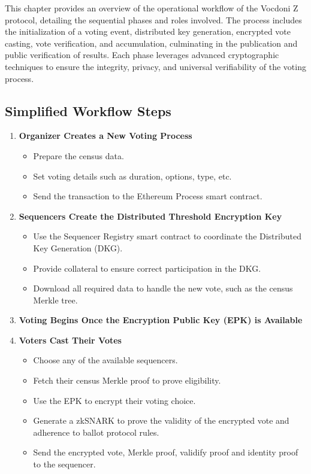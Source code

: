 
This chapter provides an overview of the operational workflow of the Vocdoni Z protocol, detailing the sequential phases and roles involved. The process includes the initialization of a voting event, distributed key generation, encrypted vote casting, vote verification, and accumulation, culminating in the publication and public verification of results. Each phase leverages advanced cryptographic techniques to ensure the integrity, privacy, and universal verifiability of the voting process.

\subsection{Simplified Workflow Steps}

\begin{enumerate}
	\item \textbf{Organizer Creates a New Voting Process}
	
		\begin{itemize}
			\item Prepare the census data.
			\item Set voting details such as duration, options, type, etc.
			\item Send the transaction to the Ethereum Process smart contract.
		\end{itemize}
	
	\item \textbf{Sequencers Create the Distributed Threshold Encryption Key}
	
			\begin{itemize}
				\item Use the Sequencer Registry smart contract to coordinate the Distributed Key Generation (DKG).
				\item Provide collateral to ensure correct participation in the DKG.
				\item Download all required data to handle the new vote, such as the census Merkle tree.
			\end{itemize}
	
	\item \textbf{Voting Begins Once the Encryption Public Key (EPK) is Available}
	
	\item \textbf{Voters Cast Their Votes}

			\begin{itemize}
				\item Choose any of the available sequencers.
				\item Fetch their census Merkle proof to prove eligibility.
				\item Use the EPK to encrypt their voting choice.
				\item Generate a zkSNARK to prove the validity of the encrypted vote and adherence to ballot protocol rules.
				\item Send the encrypted vote, Merkle proof, validify proof and identity proof to the sequencer.
			\end{itemize}
	 

\end{enumerate}
